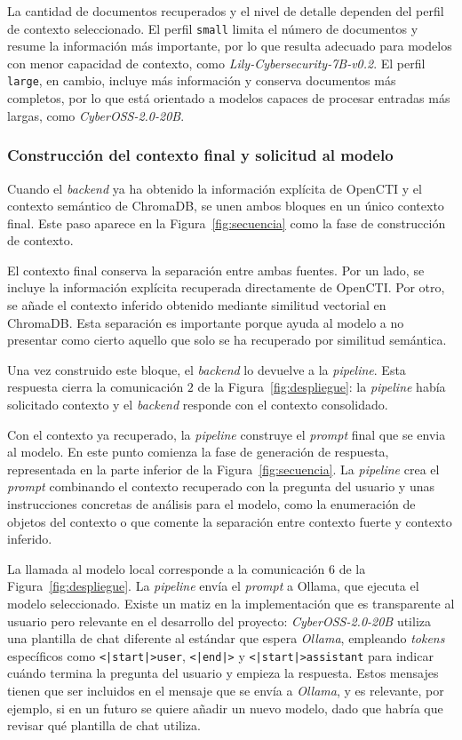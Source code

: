 \documentclass[12pt]{report}
\begin{document}
La cantidad de documentos recuperados y el nivel de detalle dependen del perfil de contexto seleccionado. El perfil \texttt{small} limita el número de documentos y resume la información más importante, por lo que resulta adecuado para modelos con menor capacidad de contexto, como \textit{Lily-Cybersecurity-7B-v0.2}. El perfil \texttt{large}, en cambio, incluye más información y conserva documentos más completos, por lo que está orientado a modelos capaces de procesar entradas más largas, como \textit{CyberOSS-2.0-20B}.

\subsubsection*{Construcción del contexto final y solicitud al modelo}

Cuando el \textit{backend} ya ha obtenido la información explícita de OpenCTI y el contexto semántico de ChromaDB, se unen ambos bloques en un único contexto final. Este paso aparece en la Figura~\ref{fig:secuencia} como la fase de construcción de contexto.

El contexto final conserva la separación entre ambas fuentes. Por un lado, se incluye la información explícita recuperada directamente de OpenCTI. Por otro, se añade el contexto inferido obtenido mediante similitud vectorial en ChromaDB. Esta separación es importante porque ayuda al modelo a no presentar como cierto aquello que solo se ha recuperado por similitud semántica.

Una vez construido este bloque, el \textit{backend} lo devuelve a la \textit{pipeline}. Esta respuesta cierra la comunicación $2$ de la Figura~\ref{fig:despliegue}: la \textit{pipeline} había solicitado contexto y el \textit{backend} responde con el contexto consolidado.

Con el contexto ya recuperado, la \textit{pipeline} construye el \textit{prompt} final que se envia al modelo. En este punto comienza la fase de generación de respuesta, representada en la parte inferior de la Figura~\ref{fig:secuencia}. La \textit{pipeline} crea el \textit{prompt} combinando el contexto recuperado con la pregunta del usuario y unas instrucciones concretas de análisis para el modelo, como la enumeración de objetos del contexto o que comente la separación entre contexto fuerte y contexto inferido.

La llamada al modelo local corresponde a la comunicación $6$ de la Figura~\ref{fig:despliegue}. La \textit{pipeline} envía el \textit{prompt} a Ollama, que ejecuta el modelo seleccionado. Existe un matiz en la implementación que es transparente al usuario pero relevante en el desarrollo del proyecto: \textit{CyberOSS-2.0-20B} utiliza una plantilla de chat diferente al estándar que espera \textit{Ollama}, empleando \textit{tokens} específicos como \texttt{<|start|>user}, \texttt{<|end|>} y \texttt{<|start|>assistant} para indicar cuándo termina la pregunta del usuario y empieza la respuesta. Estos mensajes tienen que ser incluidos en el mensaje que se envía a \textit{Ollama}, y es relevante, por ejemplo, si en un futuro se quiere añadir un nuevo modelo, dado que habría que revisar qué plantilla de chat utiliza.
\end{document}
